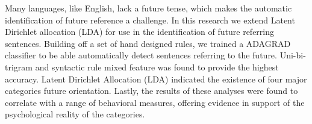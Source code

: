 Many languages, like English, lack a future tense, which makes the automatic identification of future reference a challenge. In this research we extend Latent Dirichlet allocation (LDA) for use in the identification of future referring sentences. Building off a set of hand designed rules, we trained a ADAGRAD classifier to be able automatically detect sentences referring to the future. Uni-bi-trigram and syntactic rule mixed feature was found to provide the highest accuracy. Latent Dirichlet Allocation (LDA) indicated the existence of four major categories future orientation. Lastly, the results of these analyses were found to correlate with a range of behavioral measures, offering evidence in support of the psychological reality of the categories.
